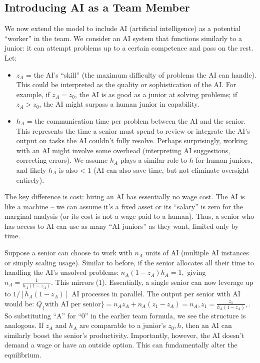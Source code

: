 \documentclass[12pt]{article}
\begin{document}
\subsection{Introducing AI as a Team Member}\label{introducing-ai-as-a-team-member}

We now extend the model to include {AI (artificial intelligence)}
as a potential ``worker'' in the team. We consider an AI system that
functions similarly to a junior: it can attempt problems up to a certain
competence and pass on the rest. Let:

\begin{itemize}

\item
  \(z_A\) = the AI's ``skill'' (the maximum difficulty of problems the
  AI can handle). This could be interpreted as the quality or
  sophistication of the AI. For example, if \(z_A = z_0\), the AI is as
  good as a junior at solving problems; if \(z_A > z_0\), the AI might
  surpass a human junior in capability.
\item
  \(h_A\) = the communication time per problem between the AI and the
  senior. This represents the {time a senior must spend to review
  or integrate the AI's output on tasks the AI couldn't fully resolve}.
  Perhaps surprisingly, working with an AI might involve some overhead
  (interpreting AI suggestions, correcting errors). We assume \(h_A\)
  plays a similar role to \(h\) for human juniors, and likely \(h_A\) is
  also \textless{} 1 (AI can also save time, but not eliminate oversight
  entirely).
\end{itemize}

The key difference is {cost:} hiring an AI has essentially
{no wage cost}. The AI is like a machine -- we can assume it's a
fixed asset or its ``salary'' is zero for the marginal analysis (or its
cost is not a wage paid to a human). Thus, a senior who has access to AI
can use as many ``AI juniors'' as they want, limited only by time.

Suppose a senior can choose to work with {\(n_A\) units of AI}
(multiple AI instances or simply scaling usage). Similar to before, if
the senior allocates all their time to handling the AI's unsolved
problems: \(n_A (1 - z_A) h_A = 1,\) giving
\(n_A = \frac{1}{h_A(1-z_A)}.\) This mirrors (1). Essentially, a
single senior can now leverage up to \(1/[h_A(1-z_A)]\) AI processes in
parallel. The {output per senior with AI} would be: $
Q_\{\text{with AI per senior}\} = n_A z_A + n_A (z_1 - z_A) =
n_A, z_1 = \frac{z_1}{h_A(1-z_A)},. \tag{7}$ So substituting
``A'' for ``0'' in the earlier team formula, we see the structure is
analogous. If \(z_A\) and \(h_A\) are comparable to a junior's
\(z_0, h\), then an AI can similarly boost the senior's productivity.
{Importantly, however, the AI doesn't demand a wage or have an
outside option.} This can fundamentally alter the equilibrium.
\end{document}
